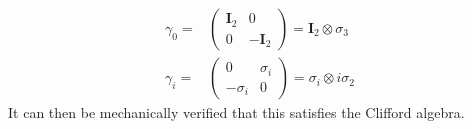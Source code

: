 \begin{align*}
\gamma_0=&\begin{pmatrix} 
\mathbf{I}_2&0 \\
0&-\mathbf{I}_2
\end{pmatrix}=\mathbf{I}_2\otimes \sigma_3\\
\gamma_i=&\begin{pmatrix} 
0&\sigma_i \\
-\sigma_i&0
\end{pmatrix}=\sigma_i\otimes i\sigma_2
\end{align*}
It can then be mechanically verified that this satisfies the Clifford algebra.


